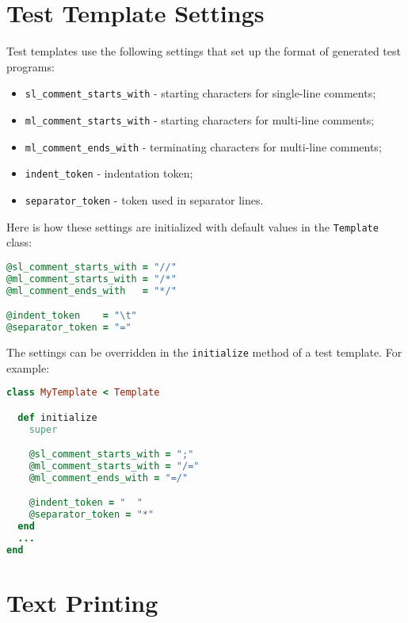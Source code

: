 \documentclass[oneside,final,12pt]{extreport}
\begin{document}
\section{Test Template Settings}

Test templates use the following settings that set up the format of generated 
test programs:

\begin{itemize}
\item \texttt{sl{\_}comment{\_}starts{\_}with} - starting characters for single-line comments;
\item \texttt{ml{\_}comment{\_}starts{\_}with} - starting characters for multi-line comments;
\item \texttt{ml{\_}comment{\_}ends{\_}with} - terminating characters for multi-line comments;
\item \texttt{indent{\_}token} - indentation token;
\item \texttt{separator{\_}token} - token used in separator lines.
\end{itemize}

Here is how these settings are initialized with default values in
the \texttt{Template} class:

\begin{lstlisting}[language=ruby]
@sl_comment_starts_with = "//"
@ml_comment_starts_with = "/*"
@ml_comment_ends_with   = "*/"

@indent_token    = "\t"
@separator_token = "="
\end{lstlisting}

The settings can be overridden in the \texttt{initialize} method of a test template.
For example:

\begin{lstlisting}[language=ruby]
class MyTemplate < Template

  def initialize
    super

    @sl_comment_starts_with = ";" 
    @ml_comment_starts_with = "/="
    @ml_comment_ends_with = "=/"

    @indent_token = "  "
    @separator_token = "*" 
  end
  ...
end
\end{lstlisting}


\section{Text Printing}
\end{document}

